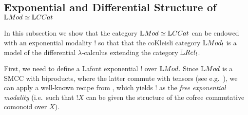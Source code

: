 %
%
%
%

%
%








\subsection{Exponential and Differential Structure of $\Mod\simeq\GMet$}

In this subsection we show that the category $\Mod\simeq \GMet$ can be endowed with an exponential modality $!$ so that that the coKleisli category $\Mod_{!}$ is a model of the differential $\lambda$-calculus extending the category $\LREL_{!}$. 

First, we need to define a Lafont exponential $!$ over $\Mod$.
Since $\Mod $ is a SMCC with biproducts, where the latter commute with tensors
(see e.g.~\cite[Theorem 4.7.11]{Russo2007}), we can apply a well-known recipe from \cite{Mellies2018, Manzo2013}, which yields $!$ as the \emph{free exponential modality} (i.e.~such that $!X$ can be given the structure of the cofree commutative comonoid over $X$). 


